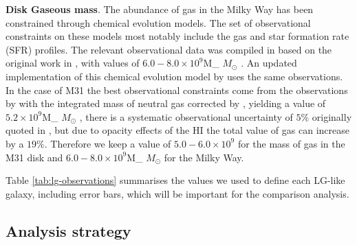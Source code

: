 \documentclass[useAMS,usenatbib]{mn2e}
\def \Msun {\ifmmode M_{\odot} \else $M_{\odot}$ \fi}
\begin{document}
{\bf Disk Gaseous mass}. The abundance of gas in the Milky Way has
been constrained through chemical evolution models. The set of
observational constraints on these models most notably include the gas
and star formation rate (SFR) profiles. The relevant observational
data was compiled in \citep{Boissier99} based on the original work in
\cite{Kulkarni87,Dame93}, with values of $6.0-8.0 \times 10^{9}$\Msun.
An updated implementation of this chemical evolution model by
\citep{Yin09} uses the same observations. In the case of M31 the best
observational constraints come from the observations by \citep{Cram80}
with the integrated mass of neutral gas corrected by \citep{Dame93},
yielding a value of $5.2\times 10^{9}$\Msun, there is a systematic
observational uncertainty of $5\%$ originally quoted in
\citep{Cram80}, but due to opacity effects of the HI \citep{Braun92}
the total value of gas can increase by a $19\%$. Therefore we keep a
value of $5.0-6.0\times 10^{9}$ for the mass of gas in the M31 disk
and $6.0-8.0\times 10^{9}$\Msun for the Milky Way.

Table \ref{tab:lg-observations} summarises the values we used to
define each LG-like galaxy, including error bars, which will be
important for the comparison analysis.

\subsection{Analysis strategy}
\label{sec:strategy}
\end{document}
